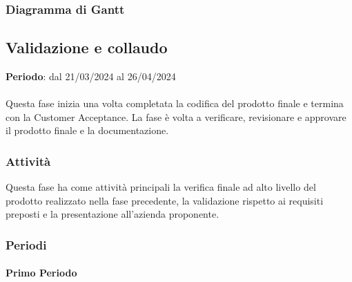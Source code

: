 \newpage 
\subsubsection{Diagramma di Gantt}\label{sec:pianificazione:progCodifica:gantt}


\subsection{Validazione e collaudo}\label{sec:pianificazione:val_collaudo}

\textbf{Periodo}: dal 21/03/2024 al 26/04/2024\\\\
Questa fase inizia una volta completata la codifica del prodotto finale e termina con la Customer Acceptance. La fase è volta a verificare, revisionare e approvare il prodotto finale e la documentazione.

\subsubsection{Attività}\label{sec:pianificazione:val_collaudo:attivita}
Questa fase ha come attività principali la verifica finale ad alto livello del prodotto realizzato nella fase precedente, la validazione rispetto ai requisiti preposti e la presentazione all'azienda proponente.

\subsubsection{Periodi}\label{sec:pianificazione:val_collaudo:periodi}
\paragraph{Primo Periodo}\label{sec:pianificazione:val_collaudo:periodi:primo}

